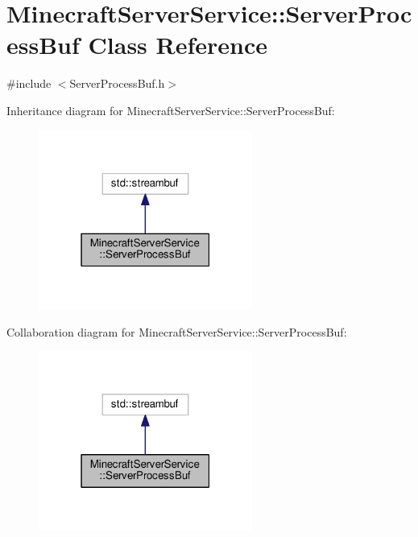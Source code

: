 \hypertarget{class_minecraft_server_service_1_1_server_process_buf}{}\section{Minecraft\+Server\+Service\+:\+:Server\+Process\+Buf Class Reference}
\label{class_minecraft_server_service_1_1_server_process_buf}


{\ttfamily \#include $<$Server\+Process\+Buf.\+h$>$}



Inheritance diagram for Minecraft\+Server\+Service\+:\+:Server\+Process\+Buf\+:\nopagebreak
\begin{figure}[H]
\begin{center}
\leavevmode
\includegraphics[width=199pt]{class_minecraft_server_service_1_1_server_process_buf__inherit__graph}
\end{center}
\end{figure}


Collaboration diagram for Minecraft\+Server\+Service\+:\+:Server\+Process\+Buf\+:\nopagebreak
\begin{figure}[H]
\begin{center}
\leavevmode
\includegraphics[width=199pt]{class_minecraft_server_service_1_1_server_process_buf__coll__graph}
\end{center}
\end{figure}
